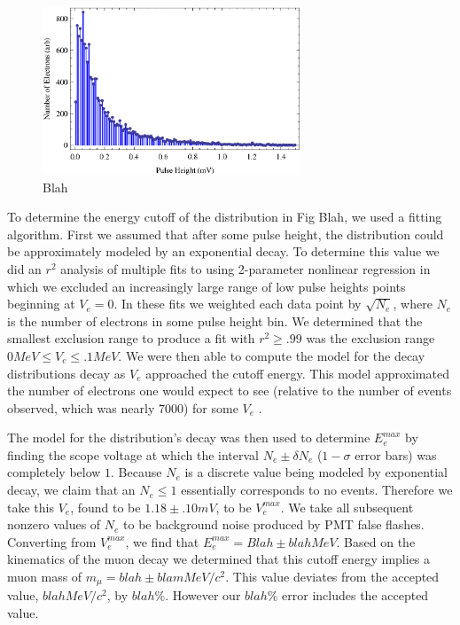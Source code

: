 \begin{figure}[htbp]
\begin{center}
\includegraphics[height=50mm]{./figures/Electron_Energy_Cutoff.eps}
\caption{Blah}
\label{figure:logic}
\end{center}
\end{figure}

To determine the energy cutoff of the distribution in Fig Blah, we used a fitting algorithm.  First we assumed that after some pulse height, the distribution could be approximately modeled by an exponential decay.  To determine this value we did an $r^{2}$ analysis of multiple fits to using 2-parameter nonlinear regression in which we excluded an increasingly large range of low pulse heights points beginning at $V_{e}=0$.  In these fits we weighted each data point by $\sqrt{N_{e}}$, where $N_{e}$ is the number of electrons in some pulse height bin.  We determined that the smallest exclusion range to produce a fit with $r^{2}\geq.99$ was the exclusion range $0 MeV \leq V_{e}\leq .1 MeV$.  We were then able to compute the model for the decay distributions decay as $V_{e}$ approached the cutoff energy.  This model approximated the number of electrons one would expect to see (relative to the number of events observed, which was nearly 7000) for some $V_{e}$ .  

The model for the distribution's decay was then used to determine $E_{e}^{max}$ by finding the scope voltage at which the interval $N_{e}\pm \delta N_{e}$ ($1-\sigma$ error bars) was completely below $1$.  Because $N_{e}$ is a discrete value being modeled by exponential decay, we claim that an $N_{e} \leq 1$ essentially corresponds to no events.  Therefore we take this $V_{e}$, found to be $1.18\pm.10 mV$, to be $V_{e}^{max}$. We take all subsequent nonzero values of $N_{e}$ to be background noise produced by PMT false flashes.  Converting from $V_{e}^{max}$, we find that $E_{e}^{max}=Blah \pm blah MeV$.  Based on the kinematics of the muon decay we determined that this cutoff energy implies a muon mass of $m_{\mu} = blah \pm blam MeV/c^{2}$.  This value deviates from the accepted value, $blah MeV/c^{2}$, by $blah\%$.  However our $blah\%$ error includes the accepted value.

